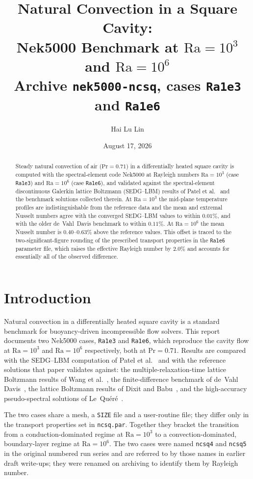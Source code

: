 \documentclass[11pt,a4paper]{article}
\title{Natural Convection in a Square Cavity:\\
Nek5000 Benchmark at $\mathrm{Ra}=10^{3}$ and $\mathrm{Ra}=10^{6}$\\
\large Archive \texttt{nek5000-ncsq}, cases \texttt{Ra1e3} and \texttt{Ra1e6}}
\author{Hai Lu Lin}
\date{August 17, 2026}
\begin{document}
\maketitle

\begin{abstract}
Steady natural convection of air ($\mathrm{Pr}=0.71$) in a differentially heated
square cavity is computed with the spectral-element code Nek5000 at Rayleigh
numbers $\mathrm{Ra}=10^{3}$ (case \texttt{Ra1e3}) and $\mathrm{Ra}=10^{6}$
(case \texttt{Ra1e6}), and validated against the spectral-element discontinuous
Galerkin lattice Boltzmann (SEDG--LBM) results of Patel et al.~\cite{patel2014}
and the benchmark solutions collected therein. At $\mathrm{Ra}=10^{3}$ the
mid-plane temperature profiles are indistinguishable from the reference data and
the mean and extremal Nusselt numbers agree with the converged SEDG--LBM values
to within $0.01\%$, and with the older de~Vahl~Davis benchmark to within
$0.11\%$. At
$\mathrm{Ra}=10^{6}$ the mean Nusselt number is $0.40$--$0.63\%$ above the
reference values. This offset is traced to the two-significant-figure rounding
of the prescribed transport properties in the \texttt{Ra1e6} parameter file,
which raises the effective Rayleigh number by $2.0\%$ and accounts for
essentially all of the observed difference.
\end{abstract}

\section{Introduction}
Natural convection in a differentially heated square cavity is a standard
benchmark for buoyancy-driven incompressible flow solvers. This report documents
two Nek5000 cases, \texttt{Ra1e3} and \texttt{Ra1e6}, which reproduce the cavity
flow at $\mathrm{Ra}=10^{3}$ and $\mathrm{Ra}=10^{6}$ respectively, both at
$\mathrm{Pr}=0.71$. Results are compared with the SEDG--LBM computation of Patel
et al.~\cite{patel2014} and with the reference solutions that paper validates
against: the multiple-relaxation-time lattice Boltzmann results of Wang et
al.~\cite{wang2013}, the finite-difference benchmark of de~Vahl
Davis~\cite{davis1983}, the lattice Boltzmann results of Dixit and
Babu~\cite{dixit2006}, and the high-accuracy pseudo-spectral solutions of
Le~Qu\'er\'e~\cite{lequere1991}.

The two cases share a mesh, a \texttt{SIZE} file and a user-routine file; they
differ only in the transport properties set in \texttt{ncsq.par}. Together they
bracket the transition from a conduction-dominated regime at $\mathrm{Ra}=10^{3}$
to a convection-dominated, boundary-layer regime at $\mathrm{Ra}=10^{6}$. The
two cases were named \texttt{ncsq4} and \texttt{ncsq5} in the original numbered
run series and are referred to by those names in earlier draft write-ups; they
were renamed on archiving to identify them by Rayleigh number.
\end{document}
